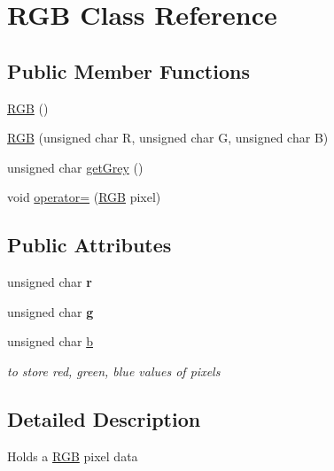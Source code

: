 \hypertarget{class_r_g_b}{}\section{R\+GB Class Reference}
\label{class_r_g_b}
\subsection*{Public Member Functions}
\begin{DoxyCompactItemize}
\item 
\hyperlink{class_r_g_b_ac82f37558b845c294de41eb2558c6619}{R\+GB} ()
\item 
\hyperlink{class_r_g_b_ad511a3b51f2a844e001b799b9dfebf7e}{R\+GB} (unsigned char R, unsigned char G, unsigned char B)
\item 
unsigned char \hyperlink{class_r_g_b_a82cce53d61ad7287c8ea9a953820f06a}{get\+Grey} ()
\item 
void \hyperlink{class_r_g_b_a957b65cf685c5fcbcc6ab6ccf2647d61}{operator=} (\hyperlink{class_r_g_b}{R\+GB} pixel)
\end{DoxyCompactItemize}
\subsection*{Public Attributes}
\begin{DoxyCompactItemize}
\item 
unsigned char {\bfseries r}\hypertarget{class_r_g_b_a8ea970fcd312802ef238733b1c9ed63d}{}\label{class_r_g_b_a8ea970fcd312802ef238733b1c9ed63d}

\item 
unsigned char {\bfseries g}\hypertarget{class_r_g_b_a3595e9a2ed44c815153aff4e84e2d97c}{}\label{class_r_g_b_a3595e9a2ed44c815153aff4e84e2d97c}

\item 
unsigned char \hyperlink{class_r_g_b_ab2a3ac761d61594e2c51d65347a74017}{b}\hypertarget{class_r_g_b_ab2a3ac761d61594e2c51d65347a74017}{}\label{class_r_g_b_ab2a3ac761d61594e2c51d65347a74017}

\begin{DoxyCompactList}\small\item\em to store red, green, blue values of pixels \end{DoxyCompactList}\end{DoxyCompactItemize}


\subsection{Detailed Description}
Holds a \hyperlink{class_r_g_b}{R\+GB} pixel data 

